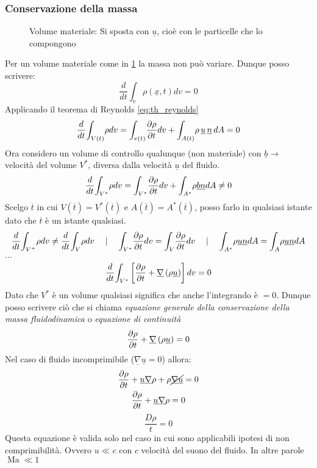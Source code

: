 \subsubsection{Conservazione della massa}
\begin{figure}[H]
    \centering
    \caption{Volume materiale: Si sposta con $ \underline{u} $, cioè con le particelle che lo compongono}
    \label{fig:ovale_volume}
\end{figure}
Per un volume materiale come in \cref{fig:ovale_volume} la massa non può variare.
Dunque posso scrivere:
\[
\frac{d}{dt} \displaystyle{\int_{v}^{}}\rho\left( \underline{x},t\right) dv = 0
\]
Applicando il teorema di Reynolds \cref{eq:th_reynolds}
\[
\frac{d}{dt} \displaystyle{\int_{V\left( t\right) }^{}}\rho dv = \displaystyle{\int_{v\left( t\right) }^{}}\frac{\partial\rho }{\partial t}dv + \displaystyle{\int_{A\left( t\right) }^{}}\rho\, \underline{u}\,\underline{n}\,dA = 0
\]
Ora considero un volume di controllo qualunque (non materiale) con $ \underline{b} \to$ velocità del volume $ V^* $, diversa dalla velocità $ \underline{u} $ del fluido.
\[
  \frac{d}{dt} \displaystyle{\int_{V^*}^{}}\rho dv = \displaystyle{\int_{V^*}^{}} \frac{\partial\rho }{\partial t} dv + \displaystyle{\int_{A^*}^{}}\rho \underline{b}\underline{n}dA \neq 0
\]
Scelgo $ \overline{t} $ in cui $ V\left( \overline{t}\right) =V^*\left( \overline{t}\right)  $ e $ A\left( \overline{t}\right) = A^* \left( \overline{t}\right) $, posso farlo in qualsiasi istante dato che $ \overline{t} $ è un istante qualsiasi.
\[
  \frac{d}{dt}\displaystyle{\int_{V^+}^{}}\rho dv \neq \frac{d}{dt} \displaystyle{\int_{V}^{}}\rho dv \quad\mid \quad \displaystyle{\int_{V^*}^{}}\frac{\partial\rho }{\partial t}dv = \displaystyle{\int_{V}^{}}\frac{\partial\rho }{\partial t}dv \quad\mid\quad \displaystyle{\int_{A^*}^{}}\rho \underline{u}\underline{n} dA = \displaystyle{\int_{A}^{}}\rho \underline{u}\underline{n}dA
\]
$ \dots  $
\begin{equation}
  \frac{d}{dt} \displaystyle{\int_{V^*}^{}}\left[ \frac{\partial\rho }{\partial t}+\underline{\nabla} \left( \rho \underline{u}\right) \right] dv = 0
\end{equation}
Dato che $ V^* $ è un volume qualsiasi significa che anche l'integrando è $ =0 $. Dunque posso scrivere ciò che si chiama \emph{equazione generale della conservazione della massa fluidodinamica} o \emph{equazione di continuità}
\begin{equation}
  \label{eq:continuità}
  \frac{\partial\rho }{\partial t} + \underline{\nabla} \left( \rho \underline{u}\right) =0
\end{equation}
Nel caso di fluido incomprimibile ($ \underline{\nabla} \underline{u} =0 $) allora:
\begin{gather*}
  \frac{\partial\rho }{\partial t} + \underline{u}\underline{\nabla}\rho + \rho \cancel{\underline{\nabla} \underline{u}} = 0\\
  \frac{\partial\rho }{\partial t} + \underline{u} \underline{\nabla}\rho =0
\end{gather*}
\begin{equation}
  \frac{D\rho }{t} = 0
\end{equation}
Questa equazione è valida solo nel caso in cui sono applicabili ipotesi di non comprimibilità. Ovvero $ u\ll c $ con $ c $ velocità del suono del fluido. In altre parole $ \operatorname{Ma} \ll 1 $ 


